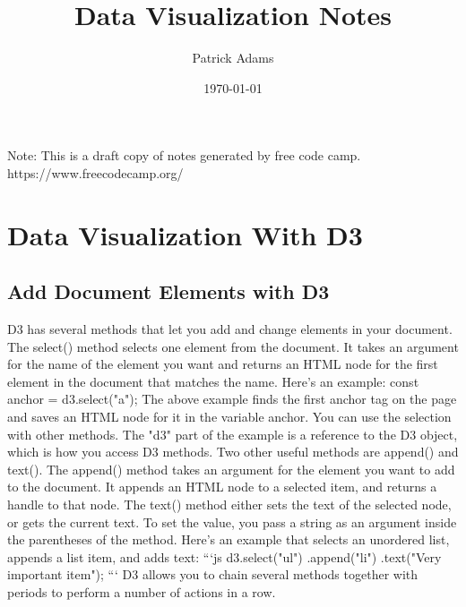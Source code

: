 \documentclass{article}%
\title{Data Visualization Notes}%
\author{Patrick Adams}%
\date{\today}%
\begin{document}
%
\normalsize%
\maketitle%
\newpage%
Note: This is a draft copy of notes generated by free code camp.\newline%
%
https://www.freecodecamp.org/%
\newpage%
\tableofcontents%
\section{Data Visualization With D3}%
\label{sec:DataVisualizationWithD3}%
\subsection{Add Document Elements with D3}%
\label{subsec:AddDocumentElementswithD3}%
D3 has several methods that let you add and change elements in your document.\newline%
The select() method selects one element from the document. It takes an argument for the name of the element you want and returns an HTML node for the first element in the document that matches the name. Here's an example:\newline%
const anchor = d3.select("a");\newline%
The above example finds the first anchor tag on the page and saves an HTML node for it in the variable anchor. You can use the selection with other methods. The "d3" part of the example is a reference to the D3 object, which is how you access D3 methods.\newline%
Two other useful methods are append() and text().\newline%
The append() method takes an argument for the element you want to add to the document. It appends an HTML node to a selected item, and returns a handle to that node.\newline%
The text() method either sets the text of the selected node, or gets the current text. To set the value, you pass a string as an argument inside the parentheses of the method.\newline%
Here's an example that selects an unordered list, appends a list item, and adds text:\newline%
```js\newline%
d3.select("ul")\newline%
  .append("li")\newline%
  .text("Very important item");\newline%
```\newline%
D3 allows you to chain several methods together with periods to perform a number of actions in a row.\newline%
\end{document}
